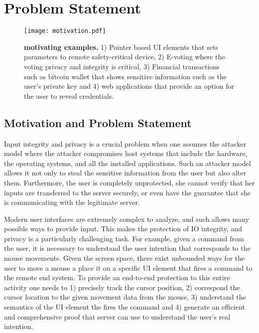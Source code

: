 \section{Problem Statement}
\label{sec:problemStatement}

\begin{figure}[t]
\centering
\texttt{[image: motivation.pdf]}
\caption{\textbf{\name motivating examples.} 1) Pointer based UI elements that sets parameters to remote safety-critical device, 2) E-voting where the voting privacy and integrity is critical, 3) Financial transactions such as bitcoin wallet that shows sensitive information such as the user's private key and 4) web applications that provide an option for the user to reveal credentials.}
\label{fig:motivation}
\centering
\end{figure}


\subsection{Motivation and Problem Statement}
Input integrity and privacy is a crucial problem when one assumes the attacker model where the attacker compromises host systems that include the hardware, the operating systems, and all the installed applications. Such an attacker model allows it not only to steal the sensitive information from the user but also alter them. Furthermore, the user is completely unprotected, she  cannot verify that her inputs are transferred to the server securely, or even have the guarantee that she is communicating with the legitimate server. 

Modern user interfaces are extremely complex to analyze, and such allows many possible ways to provide input. This makes the protection of IO integrity, and privacy is a particularly challenging task. For example, given a command from the user, it is necessary to understand the user intention that corresponds to the mouse movements. Given the screen space, there exist unbounded ways for the user to move a mouse a place it on a specific UI element that fires a command to the remote end system. To provide an end-to-end protection to this entire activity one needs to 1) precisely track the cursor position, 2) correspond the cursor location to the given movement data from the mouse, 3) understand the semantics of the UI element the fires the command and 4) generate an efficient and comprehensive proof that server can use to understand the user's real intention.  

